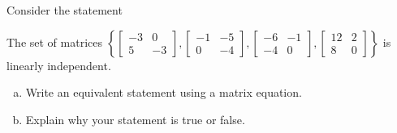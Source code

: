 
\begin{exerciseStatement}


Consider the statement 
\begin{center}\begin{minipage}{0.8\textwidth}
 The set of matrices \( \left\{ \left[\begin{array}{cc}
-3 & 0 \\
5 & -3
\end{array}\right] , \left[\begin{array}{cc}
-1 & -5 \\
0 & -4
\end{array}\right] , \left[\begin{array}{cc}
-6 & -1 \\
-4 & 0
\end{array}\right] , \left[\begin{array}{cc}
12 & 2 \\
8 & 0
\end{array}\right] \right\} \) is linearly independent.
\end{minipage}\end{center}
    


\begin{enumerate}[(a)]
\item  Write an equivalent statement using a matrix equation.
\item  Explain why your statement is true or false.
\end{enumerate}
    
\end{exerciseStatement}
    

